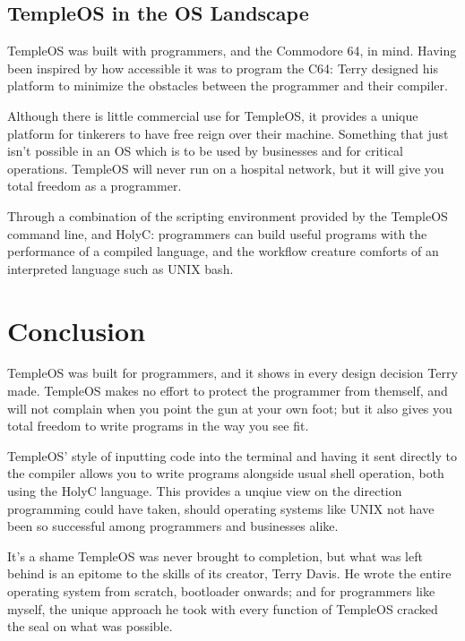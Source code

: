\documentclass[11pt]{article}
\begin{document}
 \newpage

\subsection{TempleOS in the OS Landscape}
\label{sec:org45d9a2f}

TempleOS was built with programmers, and the Commodore 64, in mind. Having been
inspired by how accessible it was to program the C64: Terry designed his
platform to minimize the obstacles between the programmer and their compiler.

Although there is little commercial use for TempleOS, it provides a unique
platform for tinkerers to have free reign over their machine. Something that
just isn't possible in an OS which is to be used by businesses and for critical
operations. TempleOS will never run on a hospital network, but it will give you
total freedom as a programmer.

Through a combination of the scripting environment provided by the TempleOS
command line, and HolyC: programmers can build useful programs with the
performance of a compiled language, and the workflow creature comforts of an
interpreted language such as UNIX bash.

 \newpage

\section{Conclusion}
\label{sec:orga04aa1a}

TempleOS was built for programmers, and it shows in every design decision Terry
made. TempleOS makes no effort to protect the programmer from themself, and will
not complain when you point the gun at your own foot; but it also gives you
total freedom to write programs in the way you see fit.

TempleOS' style of inputting code into the terminal and having it sent directly
to the compiler allows you to write programs alongside usual shell operation,
both using the HolyC language. This provides a unqiue view on the direction
programming could have taken, should operating systems like UNIX not have been
so successful among programmers and businesses alike.

It's a shame TempleOS was never brought to completion, but what was left behind
is an epitome to the skills of its creator, Terry Davis. He wrote the entire
operating system from scratch, bootloader onwards; and for programmers like
myself, the unique approach he took with every function of TempleOS cracked the
seal on what was possible.
\end{document}
